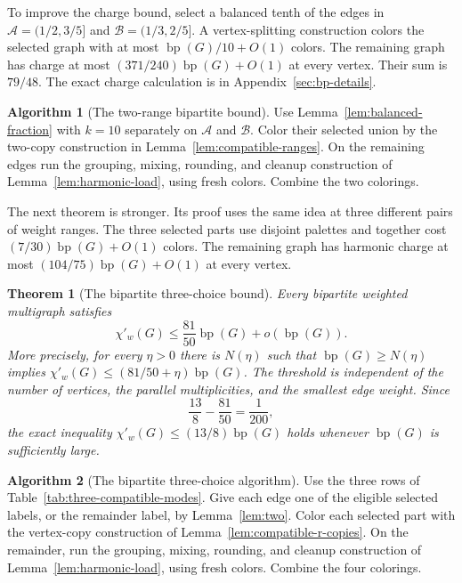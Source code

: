 \documentclass[11pt]{article}
\newtheorem{theorem}{Theorem}[section]
\theoremstyle{definition}\newtheorem{algorithm}{Algorithm}[section]
\numberwithin{equation}{section}
\theoremstyle{remark}\newtheorem*{remark}{Remark}
\newcommand{\bp}{\operatorname{bp}}
\begin{document}
To improve the charge bound, select a balanced tenth of the edges in
$\mathcal A=(1/2,3/5]$ and $\mathcal B=(1/3,2/5]$. A vertex-splitting
construction colors the selected graph with at most
$\bp(G)/10+O(1)$ colors. The remaining graph has charge at most
$(371/240)\bp(G)+O(1)$ at every vertex. Their sum is $79/48$.
The exact charge calculation is in Appendix~\ref{sec:bp-details}.

\begin{algorithm}[The two-range bipartite bound]\label{alg:bp-two-ranges}
Use Lemma~\ref{lem:balanced-fraction} with $k=10$ separately on
$\mathcal A$ and $\mathcal B$. Color their selected union by the
two-copy construction in Lemma~\ref{lem:compatible-ranges}.
On the remaining edges run the grouping, mixing, rounding, and cleanup
construction of Lemma~\ref{lem:harmonic-load}, using fresh colors.
Combine the two colorings.
\end{algorithm}

The next theorem is stronger.  Its proof uses the same idea at three
different pairs of weight ranges.  The three selected parts use disjoint
palettes and together cost $(7/30)\bp(G)+O(1)$ colors.  The remaining
graph has harmonic charge at most $(104/75)\bp(G)+O(1)$ at every vertex.

\begin{theorem}[The bipartite three-choice bound]
\label{thm:bp-unrestricted}
Every bipartite weighted multigraph satisfies
\[
 \chi'_w(G)\le\frac{81}{50}\bp(G)+o(\bp(G)).
\]
More precisely, for every $\eta>0$ there is $N(\eta)$ such that
$\bp(G)\ge N(\eta)$ implies
$\chi'_w(G)\le(81/50+\eta)\bp(G)$.  The threshold is independent of
the number of vertices, the parallel multiplicities, and the smallest
edge weight.  Since
\[
 \frac{13}{8}-\frac{81}{50}=\frac1{200},
\]
the exact inequality $\chi'_w(G)\le(13/8)\bp(G)$ holds whenever
$\bp(G)$ is sufficiently large.
\end{theorem}

\begin{algorithm}[The bipartite three-choice algorithm]\label{alg:bp}
Use the three rows of Table~\ref{tab:three-compatible-modes}.  Give each
edge one of the eligible selected labels, or the remainder label, by
Lemma~\ref{lem:two}.  Color each selected part with the vertex-copy
construction of Lemma~\ref{lem:compatible-r-copies}.  On the remainder,
run the grouping, mixing, rounding, and cleanup construction of
Lemma~\ref{lem:harmonic-load}, using fresh colors.  Combine the four
colorings.
\end{algorithm}
\end{document}
